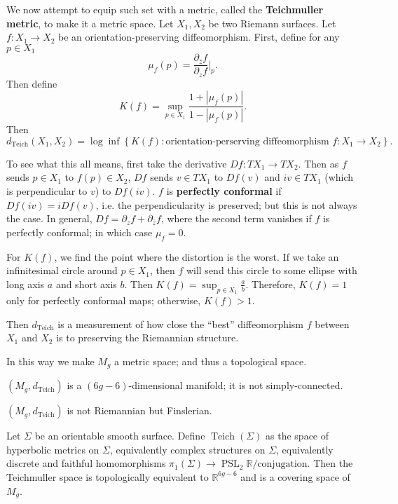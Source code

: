 We now attempt to equip such set with a metric, called the \textbf{Teichmuller metric}, to make it a metric space. Let $X_1, X_2$ be two Riemann surfaces.  Let $f : X_1\to X_2$ be an orientation-preserving diffeomorphism. First, define for any $p \in X_1$  $$
\mu_f (p) = \frac{\partial_{\bar{z}} f}{\partial_z f} |_p
.$$ Then define $$
K (f) = \sup_{p \in X_1} \frac{1 + | \mu_f (p)| }{1 - | \mu_f (p) | }
.$$ 
Then $$
d_{\text{Teich}}(X_1, X_2) = \log \inf \left\{ K(f) : \text{orientation-perserving diffeomorphism } f : X_1\to X_2\right\} 
.$$ 


To see what this all means, first take the derivative $Df : TX_1 \to TX_2$. Then as $f$ sends $p \in X_1$ to $f(p) \in X_2$, $Df$ sends $v \in TX_1$ to $Df(v)$ and $iv \in TX_1$ (which is perpendicular to $v$) to $Df(iv)$. $f$ is \textbf{perfectly conformal} if $Df(i v) = i Df(v)$, i.e. the perpendicularity is preserved; but this is not always the case. In general, $Df = \partial_z f + \partial_{\bar{z}} f$, where the second term vanishes if $f$ is perfectly conformal; in which case $\mu_f = 0$. 

For $K(f)$, we find the point where the distortion is the worst. If we take an infinitesimal circle around $p \in X_1$, then $f$ will send this circle to some ellipse with long axis $a$ and short axis $b$. Then $K(f) = \sup_{p \in X_1} \frac{a}{b}$.  Therefore, $K(f) = 1$ only for perfectly conformal maps; otherwise, $K(f) > 1$. 

Then $d_{\text{Teich}}$ is a measurement of how close the ``best'' diffeomorphism $f$ between $X_1$ and $X_2$ is to preserving the Riemannian structure. 


In this way we make $M_g$ a metric space; and thus a topological space. 


\begin{proposition}
  $(M_g, d_{\text{Teich}})$ is a $(6g-6)$-dimensional manifold; it is not simply-connected.   
\end{proposition}

\begin{proposition}
  $(M_g, d_{\text{Teich}})$ is not Riemannian but Finslerian.  
\end{proposition}


Let $\Sigma$ be an orientable smooth surface. Define $\operatorname{Teich}(\Sigma)$ as the space of hyperbolic metrics on $\Sigma$, equivalently complex structures on $\Sigma$, equivalently discrete and faithful homomorphisms $\pi_1(\Sigma) \to \operatorname{PSL}_2 \mathbb{R} / \text{conjugation}$.     
Then the Teichmuller space is topologically equivalent to $\mathbb{R}^{6g-6}$ and is   a covering space of $M_g$. 

